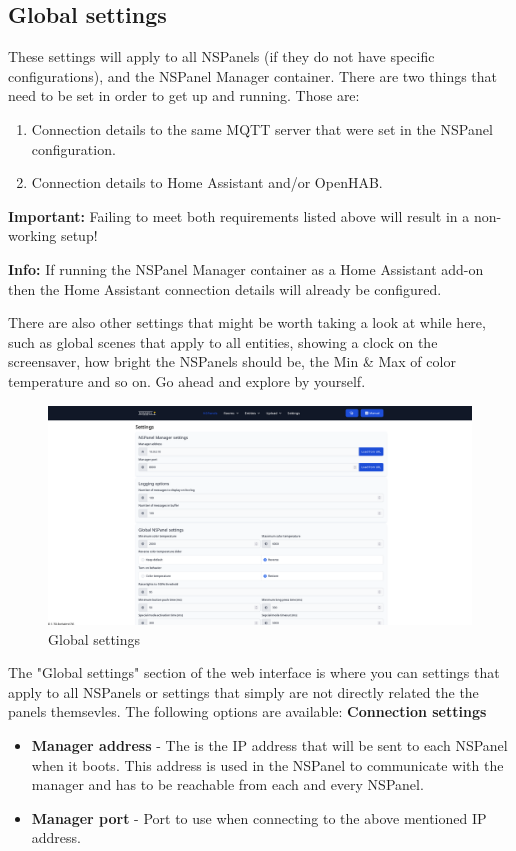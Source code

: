 \documentclass[10pt]{article}
\newcommand{\info}[1]{\begin{infoBox} \textbf{Info:} #1 \end{infoBox}}
\newcommand{\important}[1]{\begin{importantBox} \textbf{Important:} #1 \end{importantBox}}
\begin{document}
    \subsection{Global settings}
    These settings will apply to all NSPanels (if they do not have specific configurations), and the NSPanel Manager container. There are two things that need to be set in order to get up and running. Those are:
    \begin{enumerate}
      \item Connection details to the same MQTT server that were set in the NSPanel configuration.
      \item Connection details to Home Assistant and/or OpenHAB.
    \end{enumerate}
    \important{Failing to meet both requirements listed above will result in a non-working setup!}
    \info{If running the NSPanel Manager container as a Home Assistant add-on then the Home Assistant connection details will already be configured.}
    There are also other settings that might be worth taking a look at while here, such as global scenes that apply to all entities, showing a clock on the screensaver, how bright the NSPanels should be, the Min \& Max of color temperature and so on. Go ahead and explore by yourself.
    \begin{figure}[H]
    \centering
    \includegraphics[scale=0.25]{settings_page.png}
    \caption{Global settings}%
    \end{figure}

    The "Global settings" section of the web interface is where you can settings that apply to all NSPanels or settings that simply are not directly related the the panels themsevles. The following options are available:
     \textbf{Connection settings}
    \begin{itemize}
      \item \textbf{Manager address} - The is the IP address that will be sent to each NSPanel when it boots. This address is used in the NSPanel to communicate with the manager and has to be reachable from each and every NSPanel.
      \item \textbf{Manager port} - Port to use when connecting to the above mentioned IP address.
    \end{itemize}
\end{document}
